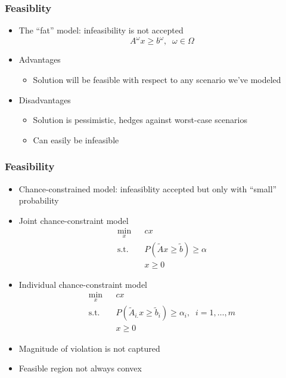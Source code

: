 \documentclass[12pt,handout]{beamer}
\begin{document}
\begin{frame}
\frametitle{Feasiblity}
\begin{itemize}
\item The ``fat'' model: infeasibility is not accepted
\begin{equation}
A^\omega x \ge b^\omega,\;\;\omega \in \Omega \nonumber
\end{equation}
\item Advantages
    \begin{itemize}
    \item Solution will be feasible with respect to any scenario we've modeled
    \end{itemize}
\item Disadvantages
    \begin{itemize}
    \item Solution is pessimistic, hedges against worst-case scenarios
    \item Can easily be infeasible
    \end{itemize}
\end{itemize}
\end{frame}

\begin{frame}
\frametitle{Feasibility}
\begin{itemize}
\item Chance-constrained model: infeasiblity accepted but only with ``small'' probability
\item Joint chance-constraint model
\begin{eqnarray}
\min_x && c x \nonumber \\
\mbox{s.t.} && P(\tilde{A}x \ge \tilde{b}) \ge \alpha \nonumber \\
&& x \ge 0 \nonumber
\end{eqnarray}
\item Individual chance-constraint model
\begin{eqnarray}
\min_x && c x \nonumber \\
\mbox{s.t.} && P(\tilde{A}_{i.} x \ge \tilde{b}_i ) \ge \alpha_i,\;\;i = 1,\ldots,m \nonumber \\
&& x \ge 0 \nonumber
\end{eqnarray}
\item Magnitude of violation is not captured
\item Feasible region not always convex
\end{itemize}
\end{frame}
\end{document}
